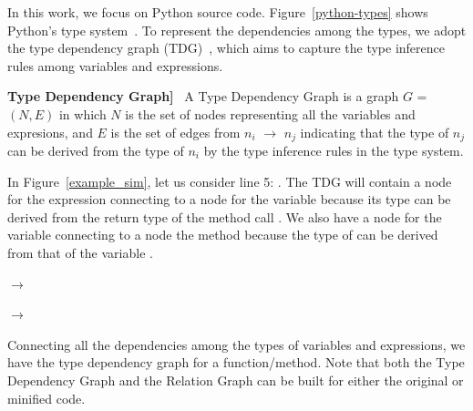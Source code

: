 In this work, we focus on Python source
code. Figure~\ref{python-types} shows Python's type
system~\cite{type-graph-icse22}.
To represent the dependencies among the types, we adopt the type
dependency graph (TDG)~\cite{type-graph-icse22}, which aims to capture
the type inference rules among variables and expressions.

\begin{definition}{\bf Type Dependency Graph]}~\cite{type-graph-icse22}
    \label{tdg-def}
A Type Dependency Graph is a graph $G$ = $(N,E)$ in which $N$ is the
set of nodes representing all the variables and expresions, and $E$ is
the set of edges from $n_i$ $\rightarrow$ $n_j$ indicating that the type of $n_j$
can be derived from the type of $n_i$ by the type inference rules in
the type system.
\end{definition}

In Figure~\ref{example_sim}, let us consider line 5: . The TDG will contain a node for the expression
 connecting to a node for the variable 
because its type can be derived from the return type of the method
call . We also have a node for the variable
 connecting to a node the method 
because the type of  can be derived from
that of the variable .

 $\rightarrow$ 

 $\rightarrow$ 

Connecting all the dependencies among the types of variables and
expressions, we have the type dependency graph for a
function/method. Note that both the Type Dependency Graph and the
Relation Graph can be built for either the original or minified code.

